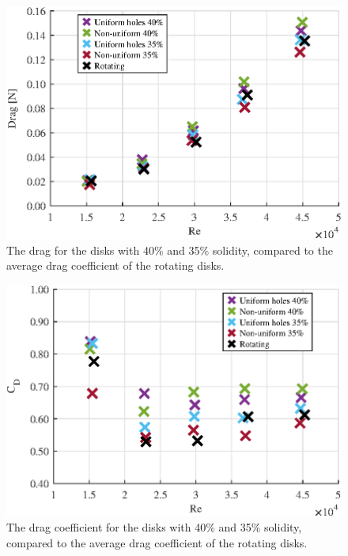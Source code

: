 \begin{figure}
    \centering
    \includegraphics[width=0.8\linewidth]{0_Images/FortyDragRe.eps}
    \caption[Drag of the disks with 40\% and 35\% solidity.]{The drag for the disks with 40\% and 35\% solidity, compared to the average drag coefficient of the rotating disks.}
    \label{fig:FortyDrag}
\end{figure}

\begin{figure}
    \centering
    \includegraphics[width=0.8\linewidth]{0_Images/FortyCDRe.eps}
    \caption[Drag coefficient of the disks with 40\% and 35\% solidity.]{The drag coefficient for the disks with 40\% and 35\% solidity, compared to the average drag coefficient of the rotating disks.}
    \label{fig:FortyCD}
\end{figure}


